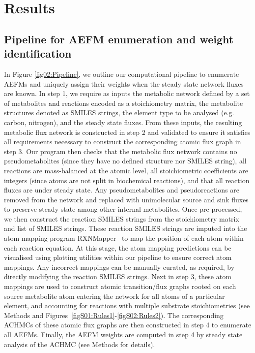 \documentclass[12pt]{article}
\begin{document}
\section*{Results}

\subsection*{Pipeline for AEFM enumeration and weight identification}

In Figure \ref{fig02:Pipeline}, we outline our computational pipeline to
enumerate AEFMs and uniquely assign their weights when the steady state
network fluxes are known. In step 1, we require as inputs the metabolic
network defined by a set of metabolites and reactions encoded as
a stoichiometry matrix, the metabolite structures denoted as SMILES
strings, the element type to be analysed (e.g. carbon, nitrogen), and the
steady state fluxes. From these inputs, the resulting metabolic flux
network is constructed in step
2 and validated to ensure it satisfies all requirements necessary to
construct the corresponding atomic flux graph in step 3. Our program then
checks that the metabolic flux network contains no pseudometabolites
(since they have no defined structure nor SMILES string), all reactions
are mass-balanced at the atomic level, all stoichiometric coefficients are
integers (since atoms are not split in biochemical reactions), and that
all reaction fluxes are under steady state. Any pseudometabolites and
pseudoreactions are removed from the network and replaced with
unimolecular source and sink fluxes to preserve steady state among other
internal metabolites. Once pre-processed, we then construct the reaction
SMILES strings from the stoichiometry matrix and list of SMILES strings.
These reaction SMILES strings are imputed into the atom mapping program
RXNMapper~\citep{Schwaller2021extraction} to map the position of each atom
within each reaction equation. At this stage, the atom mapping predictions
can be visualised using plotting utilities within our pipeline to ensure
correct atom mappings. Any incorrect mappings can be manually curated, as
required, by directly modifying the reaction SMILES strings. Next in step
3, these atom mappings are used to construct atomic transition/flux graphs
rooted on each source metabolite atom entering the network for all atoms
of a particular element, and accounting for reactions with multiple
substrate stoichiometries (see Methods and
Figures~{\ref{figS01:Rules1}}-{\ref{figS02:Rules2}}). The corresponding
ACHMCs of these atomic flux graphs are then constructed in step 4 to
enumerate all AEFMs. Finally, the AEFM weights are computed in step 4 by
steady state analysis of the ACHMC (see Methods for details).
\end{document}
